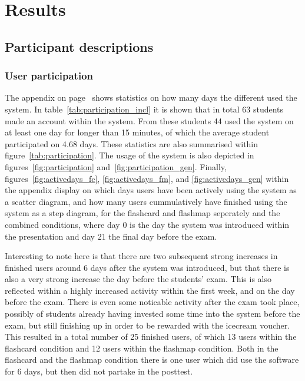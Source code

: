 \chapter{Results}
\label{ch:results}

\section{Participant descriptions}

\subsection{User participation}

The  appendix on page~\pageref{app:participation} shows statistics on how many days the different used the system. In table~\ref{tab:participation_incl} it is shown that in total 63 students made an account within the system. From these students 44 used the system on at least one day for longer than 15 minutes, of which the average student participated on 4.68 days. These statistics are also summarised within figure~\ref{tab:participation}. The usage of the system is also depicted in figures~\ref{fig:participation} and~\ref{fig:participation_gen}. Finally, figures~\ref{fig:activedays_fc}, \ref{fig:activedays_fm}, and \ref{fig:activedays_gen} within the appendix display on which days users have been actively using the system as a scatter diagram, and how many users cummulatively have finished using the system as a step diagram, for the flashcard and flashmap seperately and the combined conditions, where day 0 is the day the system was introduced within the presentation and day 21 the final day before the exam.

Interesting to note here is that there are two subsequent strong increases in finished users around 6 days after the system was introduced, but that there is also a very strong increase the day before the students' exam. This is also reflected within a highly increased activity within the first week, and on the day before the exam. There is even some noticable activity after the exam took place, possibly of students already having invested some time into the system before the exam, but still finishing up in order to be rewarded with the icecream voucher. This resulted in a total number of 25 finished users, of which 13 users within the flashcard condition and 12 users within the flashmap condition. Both in the flashcard and the flashmap condition there is one user which did use the software for 6 days, but then did not partake in the posttest.


